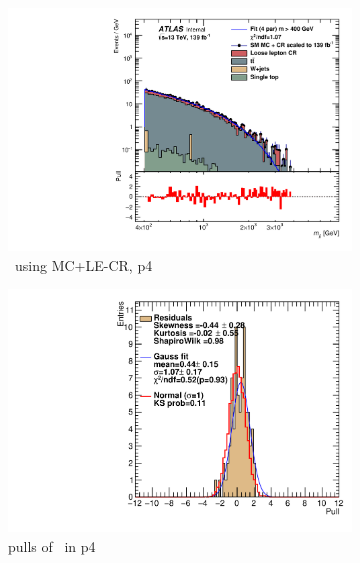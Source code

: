  \begin{figure}[ht]
    \centering
    \begin{subfigure}[h]{0.38\linewidth}
    \includegraphics[scale=0.3]{figs/ch6/fit/variable_nosmooth/p4/01PB/output_SMMCplusCR_Mjj_p4.pdf}%
    \caption{\mjj \ using MC+LE-CR, p4}
    \end{subfigure}
    \hfill
    \begin{subfigure}[h]{0.4\linewidth}
    \includegraphics[scale=0.32]{figs/ch6/fit/variable_nosmooth/p4/01PB/pull_SMMCplusCR_Mjj_p4.pdf}%
    \caption{pulls of \mjj \ in p4}
    \end{subfigure}
    \hfill
    \begin{subfigure}[h]{0.38\linewidth}

\end{subfigure}
\end{figure}
